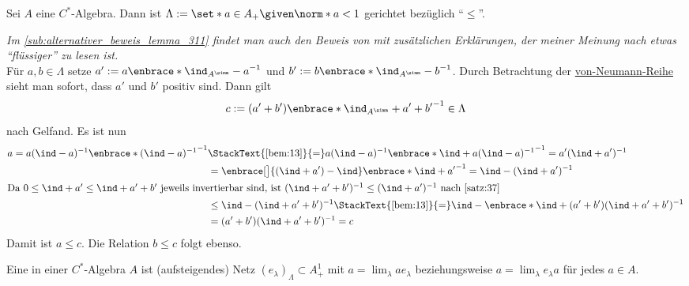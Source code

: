 \begin{lemma}[label=lem:311,{name=[gerichtete Menge in einer $C^*$-Algebra]}]
	Sei $A$ eine $C^*$-Algebra. Dann ist $\Lambda := \set*{a \in A_+ \given \norm*{a} < 1}$ gerichtet bezüglich \enquote{$\le$}.
\end{lemma}
\begin{beweis}
	\emph{Im \cref{sub:alternativer_beweis_lemma_311} findet man auch den Beweis von \citeauthor{Murphy} mit zusätzlichen Erklärungen, der meiner Meinung nach etwas \enquote{flüssiger} zu lesen ist.}\\
	Für $a,b \in \Lambda$ setze $a' := a \enbrace*{\ind_{A^\simm}-a}^{-1}$ und $b' := b \enbrace*{\ind_{A^\simm} -b}^{-1}$.
	Durch Betrachtung der \hyperref[satz15_neumann]{von-Neumann-Reihe} sieht man sofort, dass $a'$ und $b'$ positiv sind.
	Dann gilt 
	\[
		c := (a' +b') \enbrace*{\ind_{A^\simm} + a' +b'}^{-1} \in \Lambda
	\]
	 nach Gelfand. Es ist nun
	 \begin{align}
	 	a=a(\ind-a)^{-1} \enbrace*{(\ind-a)^{-1}}^{-1} &\StackText{\ref{bem:13}}{=} a (\ind -a)^{-1} \enbrace*{\ind + a (\ind -a)^{-1}}^{-1} = a' (\ind+a')^{-1} \\
		&= \enbrace[\big]{(\ind +a')-\ind} \enbrace*{\ind +a'}^{-1} = \ind - (\ind +a')^{-1} \\
		\intertext{Da $0\le \ind +a' \le \ind + a' +b'$ jeweils invertierbar sind, ist $(\ind+ a'+b')^{-1} \le (\ind+a')^{-1}$ nach \autoref{satz:37}}
		&\le \ind - (\ind +a' +b')^{-1}\StackText{\ref{bem:13}}{=} \ind - \enbrace*{\ind + (a'+b')(\ind +a' +b')^{-1}} \\
		&= (a'+b')(\ind +a' +b')^{-1}=c
	 \end{align}
	 Damit ist $a \le c$. Die Relation $b \le c$ folgt ebenso.
\end{beweis}

\begin{definition}[{name=[approximative Eins]}]
	Eine  in einer $C^*$-Algebra $A$ ist (aufsteigendes) Netz $(e_\lambda)_\Lambda \subset A_+^1$ mit $a=\lim_\lambda a e_\lambda$ beziehungsweise 
	$a = \lim_\lambda e_\lambda a$ für jedes $a \in A$.
\end{definition}

